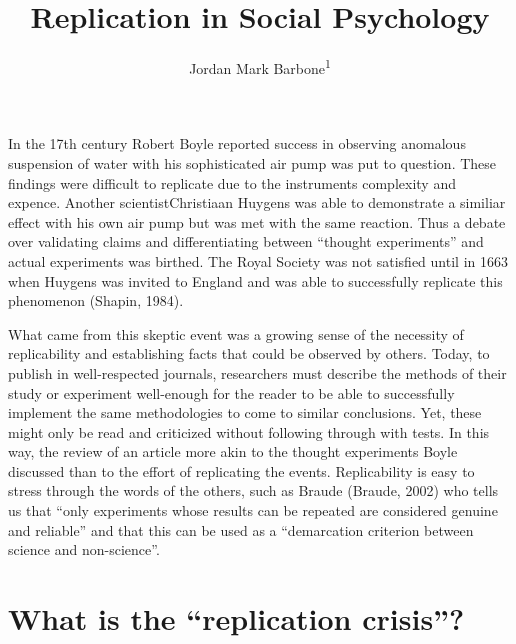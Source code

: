 \documentclass[man]{apa6}
\title{Replication in Social Psychology}
\author{Jordan Mark Barbone\textsuperscript{1}}
\date{}
\affiliation{
\vspace{0.5cm}
\textsuperscript{1} West Chester University of Pennsylvania University}
\theoremstyle{definition}
\theoremstyle{definition}
\theoremstyle{definition}
\theoremstyle{remark}
\begin{document}
\maketitle

In the 17th century Robert Boyle reported success in observing anomalous
suspension of water with his sophisticated air pump was put to question.
These findings were difficult to replicate due to the instruments
complexity and expence. Another scientistChristiaan Huygens was able to
demonstrate a similiar effect with his own air pump but was met with the
same reaction. Thus a debate over validating claims and differentiating
between \enquote{thought experiments} and actual experiments was
birthed. The Royal Society was not satisfied until in 1663 when Huygens
was invited to England and was able to successfully replicate this
phenomenon (Shapin, 1984).

What came from this skeptic event was a growing sense of the necessity
of replicability and establishing facts that could be observed by
others. Today, to publish in well-respected journals, researchers must
describe the methods of their study or experiment well-enough for the
reader to be able to successfully implement the same methodologies to
come to similar conclusions. Yet, these might only be read and
criticized without following through with tests. In this way, the review
of an article more akin to the thought experiments Boyle discussed than
to the effort of replicating the events. Replicability is easy to stress
through the words of the others, such as Braude (Braude, 2002) who tells
us that \enquote{only experiments whose results can be repeated are
considered genuine and reliable} and that this can be used as a
\enquote{demarcation criterion between science and non-science}.

\hypertarget{what-is-the-replication-crisis}{%
\section{\texorpdfstring{What is the \enquote{replication
crisis}?}{What is the ``replication crisis''?}}\label{what-is-the-replication-crisis}}
\end{document}
